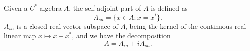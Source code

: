Given a $C^*$-algebra $A$, the self-adjoint part of $A$ is defined as
$$A_{sa} = \{x \in A : x = x^*\}.$$
$A_{sa}$ is a closed real vector subspace of $A$, being the kernel of the continuous real linear map $x \mapsto x - x^*$, and we have the decomposition
$$A = A_{sa} + iA_{sa}.$$
